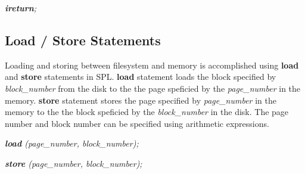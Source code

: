 \documentclass[11pt]{article}
\begin{document}
\textit{\textbf{ireturn};}


\subsection{Load / Store Statements}
Loading and storing between filesystem and memory is accomplished using \textbf{load} and \textbf{store} statements in SPL. \textbf{load} statement loads the block specified by \textit{block\_number} from the disk to the the page speficied by the \textit{page\_number} in the memory. \textbf{store} statement stores the page specified by \textit{page\_number} in the memory to the the block speficied by the \textit{block\_number} in the disk. The page number and block number can be specified using arithmetic expressions.

\textit{\textbf{load} (page\_number, block\_number);}

\textit{\textbf{store} (page\_number, block\_number);}
\end{document}
